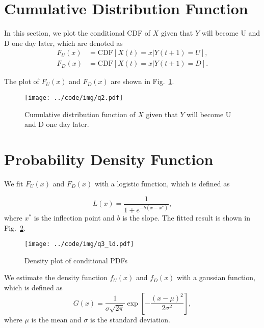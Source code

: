 \documentclass[runningheads]{llncs}
\begin{document}
\section{Cumulative Distribution Function}\label{sec:2}
In this section, we plot the conditional CDF of $X$ given that $Y$ will become U and D one day later, which are denoted as
\begin{align}
    F_U(x) & = \text{CDF}[X(t)=x|Y(t+1)=U], \\
    F_D(x) & = \text{CDF}[X(t)=x|Y(t+1)=D].
\end{align}


The plot of $F_U(x)$ and $F_D(x)$ are shown in Fig.~\ref{fig:q2}.

\begin{figure}[!htb]
    \begin{center}
        \texttt{[image: ../code/img/q2.pdf]}
    \end{center}
    \caption{ Cumulative distribution function of $X$ given that $Y$ will become U and D one day later.}
    \label{fig:q2}
\end{figure}


\section{Probability Density Function}\label{sec:3}

We fit $F_U(x)$ and $F_D(x)$ with a logistic function, which is defined as

\begin{equation}
    L(x)=\frac{1}{1+e^{-b(x-x^*)}},
\end{equation}
where $x^*$ is the inflection point and $b$ is the slope. The fitted result is shown in Fig.~\ref{fig:q3ld}.

\begin{figure}
    \begin{center}
        \texttt{[image: ../code/img/q3\_ld.pdf]}
    \end{center}
    \caption{Density plot of conditional PDFs}
    \label{fig:q3ld}
\end{figure}

We estimate the density function $f_U(x)$ and $f_D(x)$ with a gaussian function, which is defined as
\begin{equation}
    G(x)=\frac{1}{\sigma \sqrt{2 \pi}} \exp \left[-\frac{(x-\mu)^{2}}{2 \sigma^{2}}\right],
\end{equation}
where $\mu$ is the mean and $\sigma$ is the standard deviation.
\end{document}
